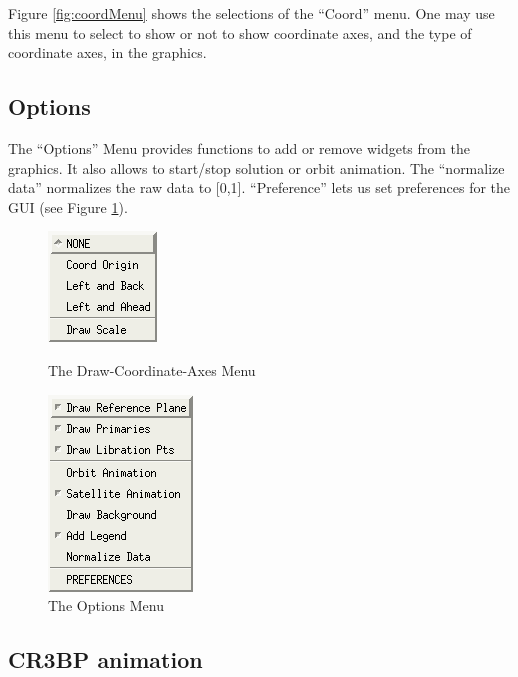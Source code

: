 Figure \ref{fig:coordMenu} shows the selections of the ``Coord'' menu.
One may use this menu to select to show or not to show 
coordinate axes, and the type of coordinate axes, in the graphics.

\subsection{Options}

The ``Options'' Menu provides functions to add or remove widgets from the graphics.
It also allows to start/stop solution or orbit animation.
The ``normalize data'' normalizes the raw data to [0,1]. 
``Preference'' lets  us set preferences for the GUI (see Figure \ref{fig:optionMenu}). 
\begin{figure}[!htmb]
	\centering
    \begin{minipage}[b]{0.5\textwidth}
        \centering
        \includegraphics {./include/drawCoordMenu}
        \caption{The Draw-Coordinate-Axes Menu} \label{fig:coordMenu}
    \end{minipage}%
    \begin{minipage}[b]{0.5\textwidth}
        \centering
        \includegraphics {./include/optionMenu}
    	\caption{The Options Menu} \label{fig:optionMenu}
    \end{minipage}
\end{figure}

\subsection{CR3BP animation}

